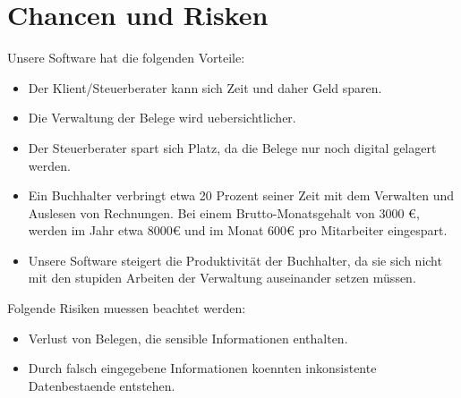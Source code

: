 \documentclass[12pt]{article}
\theoremstyle{definition}
\begin{document}
\pagebreak
\section{Chancen und Risken}


Unsere Software hat die folgenden Vorteile:
\begin{itemize}
\item Der Klient/Steuerberater kann sich Zeit und daher Geld sparen.
\item Die Verwaltung der Belege wird uebersichtlicher. 
\item Der Steuerberater spart sich Platz, da die Belege nur noch digital gelagert werden.
\item Ein Buchhalter verbringt etwa 20 Prozent seiner Zeit mit dem Verwalten und Auslesen von Rechnungen. Bei einem Brutto-Monatsgehalt von 3000 €, werden im Jahr etwa 8000€ und im Monat 600€ pro Mitarbeiter eingespart.
\item Unsere Software steigert die Produktivität der Buchhalter, da sie sich nicht mit den stupiden Arbeiten der Verwaltung
auseinander setzen müssen.
\end{itemize}

Folgende Risiken muessen beachtet werden:

\begin{itemize}
\item Verlust von Belegen, die sensible Informationen enthalten.
\item Durch falsch eingegebene Informationen koennten inkonsistente Datenbestaende entstehen.
\end{itemize}

\pagebreak
\end{document}
